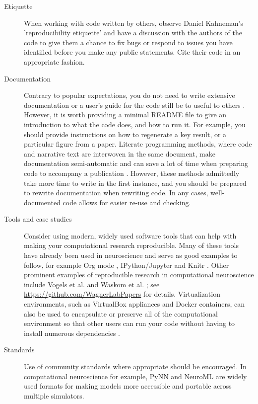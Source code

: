 \documentclass[11pt]{article}
\begin{document}
\begin{description}
\item [Etiquette] When working with code written by others, observe
  Daniel Kahneman's 'reproducibility etiquette'\cite{Kahneman2014} and
  have a discussion with the authors of the code to give them a chance
  to fix bugs or respond to issues you have identified before you make
  any public statements.  Cite their code in an appropriate fashion.


\item [Documentation] Contrary to popular expectations, you do not
  need to write extensive documentation or a user's guide for the code
  still be to useful to others \cite{Barnes2010-iv}.  However, it is
  worth providing a minimal README file to give an introduction to
  what the code does, and how to run it.  For example, you should
  provide instructions on how to regenerate a key result, or a
  particular figure from a paper. Literate programming methods, where
  code and narrative text are interwoven in the same document, make
  documentation semi-automatic and can save a lot of time when
  preparing code to accompany a publication \cite{schulte2012multi,
    gentleman2012statistical}. However, these methods admittedly take
  more time to write in the first instance, and you should be prepared
  to rewrite documentation when rewriting code.  In any cases,
  well-documented code allows for easier re-use and checking.

\item [Tools and case studies] Consider using modern, widely used software tools that can help with making your computational research reproducible.  Many of
  these tools have already been used in neuroscience and serve as good
  examples to follow, for example Org mode \cite{Delescluse2011},
  IPython/Jupyter \cite{Stevens2013} and Knitr \cite{Eglen2014}.  Other
  prominent examples of reproducible research in computational
  neuroscience include Vogels et al. \cite{Vogels2011-c8c} and Waskom
  et al. \cite{Waskom2014-gd}; see
  \url{https://github.com/WagnerLabPapers} for details.
  Virtualization environments, such as VirtualBox appliances and
  Docker containers, can also be used to
  encapsulate or preserve all of the computational environment so that
  other users can run your code without having to install numerous
  dependencies \cite{Boettiger2015}.

\item [Standards] Use of community standards where appropriate should
  be encouraged. In computational neuroscience for example, PyNN
  \cite{Davison2009} and NeuroML \cite{CannonEtAl2014} are widely used
  formats for making models more accessible and portable across
  multiple simulators.


\end{description}
\end{document}
